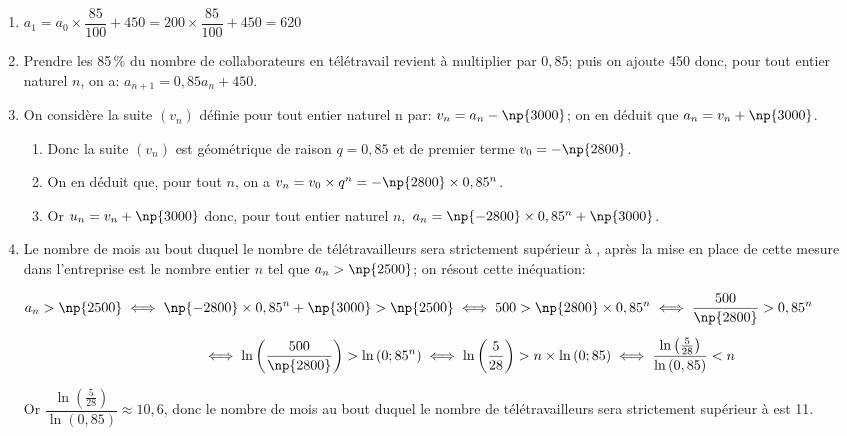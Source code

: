 \begin{enumerate}
\item $a_1 = a_0 \times \dfrac{85}{100}+ 450 = 200 \times \dfrac{85}{100}+ 450 = 620$

\item Prendre les 85\,\% du nombre de collaborateurs en télétravail revient à multiplier par $0,85$; puis on ajoute 450 donc, pour tout entier naturel $n$, on a:
$a_{n+1} = 0,85a_n + 450$.

\item On considère la suite $\left(v_n\right)$ définie pour tout entier naturel n par: $v_n = a_n - \np{3000}$; on en déduit que $a_n=v_n+\np{3000}$.

	\begin{enumerate}
		\item 
{}		
		
Donc la suite $(v_n)$ est géométrique de raison $q=0,85$ et de premier terme $v_0=-\np{2800}$.		
	
		\item On en déduit que, pour tout $n$, on a $v_n=v_0\times q^n = -\np{2800}\times 0,85^n$.
		
		\item Or $u_n=v_n+\np{3000}$ donc, pour tout entier naturel $n$,\,
$a_n = \np{- 2800} \times  0,85^n + \np{3000}$.
	\end{enumerate}
	
\item Le nombre de mois au bout duquel le nombre de télétravailleurs sera strictement supérieur à , après la mise en place de cette mesure dans l'entreprise est le nombre entier $n$ tel que $a_n>\np{2500}$; on résout cette inéquation:

$\begin{gathered}a_n>\np{2500}
\iff \np{- 2800} \times  0,85^n + \np{3000} > \np{2500}
\iff 500 > \np{2800} \times  0,85^n
\iff \dfrac{500}{\np{2800}} > 0,85^n\\[5pt]
\phantom{a_n>\np{2500}}
\iff \ln\left ( \dfrac{500}{\np{2800}} \right ) > \ln \left (0;85^n\right )
\iff \ln\left ( \dfrac{5}{28} \right ) > n\times \ln \left (0;85\right )
\iff \dfrac{\ln\left ( \frac{5}{28} \right )}{\ln \left (0,85\right )} <n\end{gathered}$

Or $\dfrac{\ln\left ( \frac{5}{28} \right )}{\ln \left (0,85\right )}\approx 10,6$, donc le nombre de mois au bout duquel le nombre de télétravailleurs sera strictement supérieur à  est 11.

\end{enumerate}

